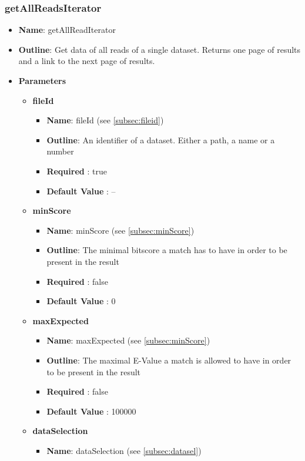 \documentclass[11pt]{article}
\begin{document}
\subsubsection{getAllReadsIterator}
\begin{itemize}
	\item \textbf{Name}: getAllReadIterator
	\item \textbf{Outline}: Get data of all reads of a single dataset. Returns one page of results and a link to the next page of results.
	\item \textbf{Parameters}
		\begin{itemize}
			\item \textbf{fileId}
				\begin{itemize}
					\item \textbf{Name}: fileId (see \ref{subsec:fileid})
					\item \textbf{Outline}: An identifier of a dataset. Either a path, a name or a number
					\item \textbf{Required} : true
					\item \textbf{Default Value} : --
				\end{itemize}
			\item \textbf{minScore}
				\begin{itemize}
					\item \textbf{Name}: minScore (see \ref{subsec:minScore})
					\item \textbf{Outline}: The minimal bitscore a match has to have in order to be present in the result
					\item \textbf{Required} : false
					\item \textbf{Default Value} : 0
				\end{itemize}
			\item \textbf{maxExpected}
				\begin{itemize}
					\item \textbf{Name}: maxExpected (see \ref{subsec:minScore})
					\item \textbf{Outline}: The maximal E-Value a match is allowed to have in order to be present in the result
					\item \textbf{Required} : false
					\item \textbf{Default Value} : 100000
				\end{itemize}
			\item \textbf{dataSelection}
				\begin{itemize}
					\item \textbf{Name}: dataSelection (see \ref{subsec:datasel})

\end{itemize}
\end{itemize}
\end{itemize}
\end{document}
